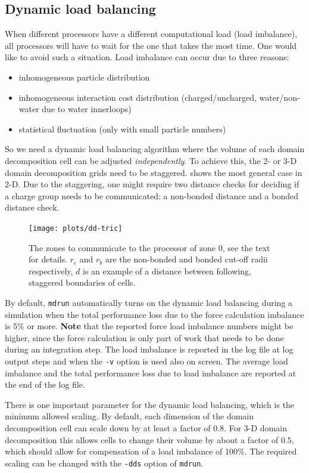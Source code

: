 \subsection{Dynamic load balancing}
When different processors have a different computational load
(load imbalance), all processors will have to wait for the one
that takes the most time. One would like to avoid such a situation.
Load imbalance can occur due to three reasons:
\begin{itemize}
\item inhomogeneous particle distribution
\item inhomogeneous interaction cost distribution (charged/uncharged,
  water/non-water due to {\gromacs} water innerloops)
\item statistical fluctuation (only with small particle numbers)
\end{itemize}
So we need a dynamic load balancing algorithm
where the volume of each domain decomposition cell
can be adjusted {\em independently}.
To achieve this, the 2- or 3-D domain decomposition grids need to be
staggered.  shows the most general case in 2-D.
Due to the staggering, one might require two distance checks
for deciding if a charge group needs to be communicated:
a non-bonded distance and a bonded distance check.

\begin{figure}
\centerline{\texttt{[image: plots/dd-tric]}}
\caption{
The zones to communicate to the processor of zone 0,
see the text for details. $r_c$ and $r_b$ are the non-bonded
and bonded cut-off radii respectively, $d$ is an example
of a distance between following, staggered boundaries of cells.
\label{fig:ddtric}
}
\end{figure}

By default, {\tt mdrun} automatically turns on the dynamic load
balancing during a simulation when the total performance loss
due to the force calculation imbalance is 5\% or more.
{\bf Note} that the reported force load imbalance numbers might be higher,
since the force calculation is only part of work that needs to be done
during an integration step.
The load imbalance is reported in the log file at log output steps
and when the {\tt -v} option is used also on screen.
The average load imbalance and the total performance loss
due to load imbalance are reported at the end of the log file.

There is one important parameter for the dynamic load balancing,
which is the minimum allowed scaling. By default, each dimension
of the domain decomposition cell can scale down by at least
a factor of 0.8. For 3-D domain decomposition this allows cells
to change their volume by about a factor of 0.5, which should allow
for compensation of a load imbalance of 100\%.
The required scaling can be changed with the {\tt -dds} option of {\tt mdrun}.

